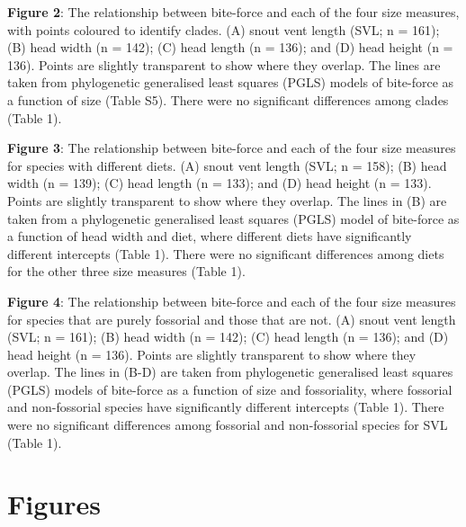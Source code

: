 \documentclass[a4paper, 12pt]{article}
\begin{document}
\textbf{Figure 2}: 
  The relationship between bite-force and each of the four size measures, with points coloured to identify clades. 
  (A) snout vent length (SVL; n = 161); (B) head width (n = 142); (C) head length (n = 136); and (D) head height (n = 136). 
  Points are slightly transparent to show where they overlap. 
  The lines are taken from phylogenetic generalised least squares (PGLS) models of bite-force as a function of size (Table S5). 
  There were no significant differences among clades (Table 1). 

\textbf{Figure 3}: 
  The relationship between bite-force and each of the four size measures for species with different diets. 
  (A) snout vent length (SVL; n = 158); (B) head width (n = 139); (C) head length (n = 133); and (D) head height (n = 133). 
  Points are slightly transparent to show where they overlap. 
  The lines in (B) are taken from a phylogenetic generalised least squares (PGLS) model of bite-force as a function of head width and diet, where different diets have significantly different intercepts (Table 1). 
  There were no significant differences among diets for the other three size measures (Table 1).


\textbf{Figure 4}: 
  The relationship between bite-force and each of the four size measures for species that are purely fossorial and those that are not. 
  (A) snout vent length (SVL; n = 161); (B) head width (n = 142); (C) head length (n = 136); and (D) head height (n = 136). 
  Points are slightly transparent to show where they overlap. 
  The lines in (B-D) are taken from phylogenetic generalised least squares (PGLS) models of bite-force as a function of size and fossoriality, where fossorial and non-fossorial species have significantly different intercepts (Table 1). 
  There were no significant differences among fossorial and non-fossorial species for SVL (Table 1). 


\newpage
\section{Figures}

\end{document}

